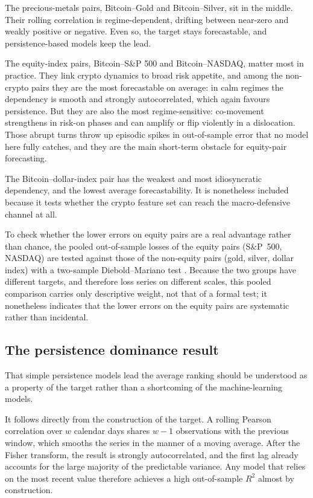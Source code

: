 The precious-metals pairs, Bitcoin--Gold and Bitcoin--Silver, sit in the middle. Their rolling correlation is regime-dependent, drifting between near-zero and weakly positive or negative. Even so, the target stays forecastable, and persistence-based models keep the lead.

The equity-index pairs, Bitcoin--S\&P 500 and Bitcoin--NASDAQ, matter most in practice. They link crypto dynamics to broad risk appetite, and among the non-crypto pairs they are the most forecastable on average: in calm regimes the dependency is smooth and strongly autocorrelated, which again favours persistence. But they are also the most regime-sensitive: co-movement strengthens in risk-on phases and can amplify or flip violently in a dislocation. Those abrupt turns throw up episodic spikes in out-of-sample error that no model here fully catches, and they are the main short-term obstacle for equity-pair forecasting.

The Bitcoin--dollar-index pair has the weakest and most idiosyncratic dependency, and the lowest average forecastability. It is nonetheless included because it tests whether the crypto feature set can reach the macro-defensive channel at all.

To check whether the lower errors on equity pairs are a real advantage rather than chance, the pooled out-of-sample losses of the equity pairs (S\&P~500, NASDAQ) are tested against those of the non-equity pairs (gold, silver, dollar index) with a two-sample Diebold--Mariano test \cite{diebold1995}. Because the two groups have different targets, and therefore loss series on different scales, this pooled comparison carries only descriptive weight, not that of a formal test; it nonetheless indicates that the lower errors on the equity pairs are systematic rather than incidental.

\subsection{The persistence dominance result}

That simple persistence models lead the average ranking should be understood as a property of the target rather than a shortcoming of the machine-learning models.

It follows directly from the construction of the target. A rolling Pearson correlation over $w$ calendar days shares $w-1$ observations with the previous window, which smooths the series in the manner of a moving average. After the Fisher transform, the result is strongly autocorrelated, and the first lag already accounts for the large majority of the predictable variance. Any model that relies on the most recent value therefore achieves a high out-of-sample $R^2$ almost by construction.

